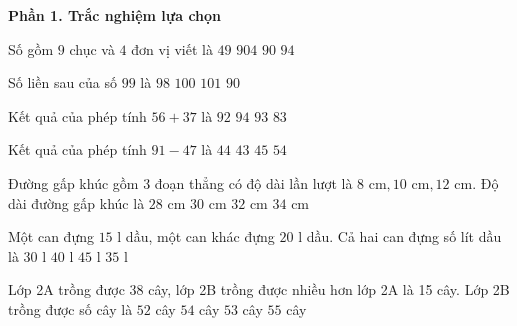 \textbf{Phần 1. Trắc nghiệm lựa chọn}

\begin{ex} %
Số gồm $9$ chục và $4$ đơn vị viết là
\choice
{$49$}
{$904$}
{$90$}
{\True $94$}
\end{ex}

\begin{ex} %
Số liền sau của số $99$ là
\choice
{$98$}
{\True $100$}
{$101$}
{$90$}
\end{ex}

\begin{ex} %
Kết quả của phép tính $56 + 37$ là
\choice
{$92$}
{$94$}
{\True $93$}
{$83$}
\end{ex}

\begin{ex} %
Kết quả của phép tính $91 - 47$ là
\choice
{\True $44$}
{$43$}
{$45$}
{$54$}
\end{ex}

\begin{ex} %
Đường gấp khúc gồm 3 đoạn thẳng có độ dài lần lượt là $8\text{ cm}, 10\text{ cm}, 12\text{ cm}$. Độ dài đường gấp khúc là
\choice
{$28\text{ cm}$}
{\True $30\text{ cm}$}
{$32\text{ cm}$}
{$34\text{ cm}$}
\end{ex}

\begin{ex} %
Một can đựng $15\text{ l}$ dầu, một can khác đựng $20\text{ l}$ dầu. Cả hai can đựng số lít dầu là
\choice
{$30\text{ l}$}
{$40\text{ l}$}
{$45\text{ l}$}
{\True $35\text{ l}$}
\end{ex}

\begin{ex} %
Lớp 2A trồng được 38 cây, lớp 2B trồng được nhiều hơn lớp 2A là 15 cây. Lớp 2B trồng được số cây là
\choice
{$52$ cây}
{$54$ cây}
{\True $53$ cây}
{$55$ cây}
\end{ex}

